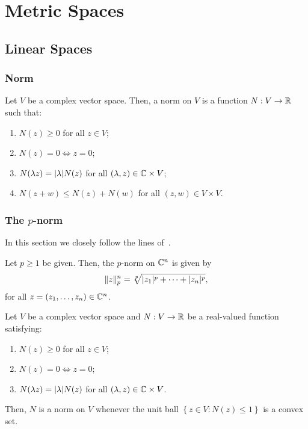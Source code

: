 \chapter{Metric Spaces}\label{chp:metric-spaces}

\section{Linear Spaces}\label{sec:linear-spaces}

\subsection{Norm}

\begin{definition}\label{def:normed-linear-spaces}
  Let \(V\) be a complex vector space. Then, a norm on \(V\) is a function
  \(N:V\to\mathbb{R}\) such that:
  \begin{enumerate}
    \item
      \(N(z)\geqslant{0}\) for all \(z\in{V}\);
    \item
      \(N(z)=0\iff{z=0}\);
    \item
      \(N(\lambda{z})=\lvert\lambda\rvert N(z)\) for all
      \((\lambda,z)\in\mathbb{C}\times{V}\);
    \item
      \(N(z+w)\leqslant{N(z)+N(w)}\) for all \((z,w)\in{V\times{V}}\).
  \end{enumerate}
\end{definition}

\subsection{The \(p\)-norm}

In this section we closely follow the lines
of~\cite{yet_another_proof_of_minkowskis_inequality}.

\begin{definition}
  Let \(p\geqslant{1}\) be given. Then, the \(p\)-norm on \(\mathbb{C}^{n}\)
  is given by
  \[
    \norm<n>(p)[z]
    =
    \sqrt[p]{\abs{z_{1}}^{p}+\cdots+\abs{z_{n}}^{p}},
  \]
  for all \(z=(z_{1},\ldots,z_{n})\in\mathbb{C}^{n}\).
\end{definition}

\begin{lemma}\label{lemma:on-norms-and-the-convexity-of-the-unitary-closed-ball}
  Let \(V\) be a complex vector space and \(N:V\to\mathbb{R}\) be a real-valued
  function satisfying:
  \begin{enumerate}
    \item
      \(N(z)\geqslant{0}\) for all \(z\in{V}\);
    \item
      \(N(z)=0\iff{z=0}\);
    \item
      \(N(\lambda{z})=\lvert\lambda\rvert N(z)\) for all
      \((\lambda,z)\in\mathbb{C}\times{V}\).
  \end{enumerate}
  Then, \(N\) is a norm on \(V\) whenever the unit ball
  \(\left\{z\in{V}:N(z)\leqslant{1}\right\}\) is a convex set.
\end{lemma}

